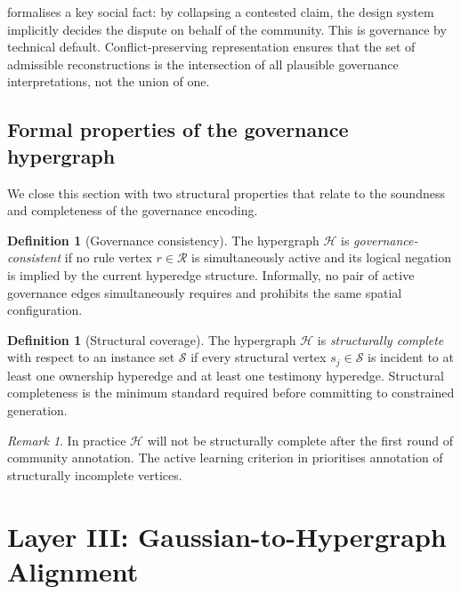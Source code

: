 \documentclass[11pt,a4paper]{article}
\theoremstyle{plain}
\theoremstyle{definition}
\newtheorem{definition}[theorem]{Definition}
\theoremstyle{remark}
\newtheorem{remark}[theorem]{Remark}
\newcommand{\HG}{\mathcal{H}}
\newcommand{\Struc}{\mathcal{S}}
\newcommand{\Rul}{\mathcal{R}}
\begin{document}
\begin{insightbox}
 formalises a key social fact: by
collapsing a contested claim, the design system implicitly decides the
dispute on behalf of the community. This is governance by technical
default. Conflict-preserving representation ensures that the set of
admissible reconstructions is the intersection of all plausible
governance interpretations, not the union of one.
\end{insightbox}

\subsection{Formal properties of the governance hypergraph}
\label{sec:layer2_properties}

We close this section with two structural properties that relate to
the soundness and completeness of the governance encoding.

\begin{definition}[Governance consistency]
The hypergraph $\HG$ is \emph{governance-consistent} if no rule vertex
$r \in \Rul$ is simultaneously active and its logical negation is
implied by the current hyperedge structure. Informally, no pair of
active governance edges simultaneously requires and prohibits the same
spatial configuration.
\end{definition}

\begin{definition}[Structural coverage]
The hypergraph $\HG$ is \emph{structurally complete} with respect to
an instance set $\Struc$ if every structural vertex $s_j \in \Struc$
is incident to at least one ownership hyperedge and at least one
testimony hyperedge. Structural completeness is the minimum standard
required before committing to constrained generation.
\end{definition}

\begin{remark}
In practice $\HG$ will not be structurally complete after the first
round of community annotation. The active learning criterion in
 prioritises annotation of structurally incomplete
vertices.
\end{remark}

\section{Layer III: Gaussian-to-Hypergraph Alignment}
\label{sec:layer3}
\end{document}
